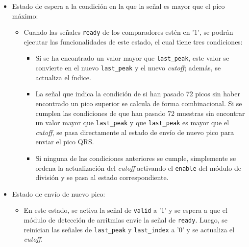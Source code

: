 \begin{itemize}
    \item Estado de espera a la condición en la que la señal es mayor que el pico máximo: 
    \begin{itemize}
        \item Cuando las señales \texttt{ready} de los comparadores estén en '1', se podrán ejecutar las funcionalidades de este estado, el cual tiene tres condiciones:
        \begin{itemize}
            \item Si se ha encontrado un valor mayor que \texttt{last\_peak}, este valor se convierte en el nuevo \texttt{last\_peak} y el nuevo \textit{cutoff}; además, se actualiza el índice. 
            \item La señal que indica la condición de si han pasado 72 picos sin haber encontrado un pico superior se calcula de forma combinacional. Si se cumplen las condiciones de que han pasado 72 muestras sin encontrar un valor mayor que \texttt{last\_peak} y que \texttt{last\_peak} es mayor que el \textit{cutoff}, se pasa directamente al estado de envío de nuevo pico para enviar el pico QRS.
            \item Si ninguna de las condiciones anteriores se cumple, simplemente se ordena la actualización del \textit{cutoff} activando el \texttt{enable} del módulo de división y se pasa al estado correspondiente.
        \end{itemize}
    \end{itemize}
    \item Estado de envío de nuevo pico:
    \begin{itemize}
        \item En este estado, se activa la señal de \texttt{valid} a '1' y se espera a que el módulo de detección de arritmias envíe la señal de \texttt{ready}. Luego, se reinician las señales de \texttt{last\_peak} y \texttt{last\_index} a '0' y se actualiza el \textit{cutoff}.
    \end{itemize}
\end{itemize}

